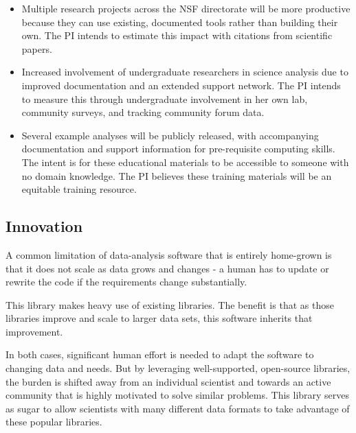 \begin{itemize}
    \item Multiple research projects across the NSF directorate will be more productive because they can use existing, documented tools rather than building their own.  The PI intends to estimate this impact with citations from scientific papers.
    \item Increased involvement of undergraduate researchers in science analysis due to improved documentation and an extended support network.  The PI intends to measure this through undergraduate involvement in her own lab, community surveys, and tracking community forum data.
    \item Several example analyses will be publicly released, with accompanying documentation and support information for pre-requisite computing skills.  The intent is for these educational materials to be accessible to someone with no domain knowledge.  The PI believes these training materials will be an equitable training resource.
\end{itemize}


\subsection{Innovation}

A common limitation of data-analysis software that is entirely home-grown is that it does not scale as data grows and changes - a human has to update or rewrite the code if the requirements change substantially.

This library makes heavy use of existing libraries.  The benefit is that as those libraries improve and scale to larger data sets, this software inherits that improvement.  

In both cases, significant human effort is needed to adapt the software to changing data and needs.  But by leveraging well-supported, open-source libraries, the burden is shifted away from an individual scientist and towards an active community that is highly motivated to solve similar problems.  This library serves as sugar to allow scientists with many different data formats to take advantage of these popular libraries.

